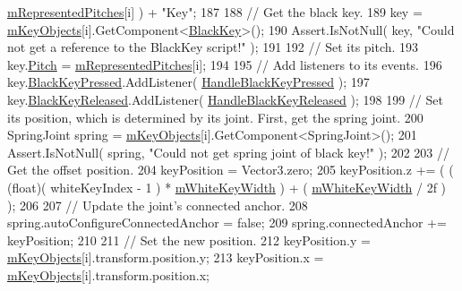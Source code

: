\begin{DoxyCode}
      \hyperlink{group___key_contain_priv_var_ga103945a6efe3469191e5253d13fec5be}{mRepresentedPitches}[i] ) + \textcolor{stringliteral}{"Key"};
187 
188                 \textcolor{comment}{// Get the black key.}
189                 key = \hyperlink{group___key_contain_priv_var_ga01addf187bb12ffe824374df98e2c2d8}{mKeyObjects}[i].GetComponent<\hyperlink{class_black_key}{BlackKey}>();
190                 Assert.IsNotNull( key, \textcolor{stringliteral}{"Could not get a reference to the BlackKey script!"} );
191 
192                 \textcolor{comment}{// Set its pitch.}
193                 key.\hyperlink{group___black_key_pub_var_gad233c456182c9cef7c01486484940439}{Pitch} = \hyperlink{group___key_contain_priv_var_ga103945a6efe3469191e5253d13fec5be}{mRepresentedPitches}[i];
194 
195                 \textcolor{comment}{// Add listeners to its events.}
196                 key.\hyperlink{group___black_key_events_ga51f1badf49df0c54e31a20ba4b7abd6b}{BlackKeyPressed}.AddListener( 
      \hyperlink{group___key_contain_handlers_ga05cc2543fd9772b26e27bf4f6247ab47}{HandleBlackKeyPressed} );
197                 key.\hyperlink{group___black_key_events_ga2710bdaba16dbdb82c0d38f11ce642d8}{BlackKeyReleased}.AddListener( 
      \hyperlink{group___key_contain_handlers_ga5a0c5565c5ebc6026b3122f487e51704}{HandleBlackKeyReleased} );
198 
199                 \textcolor{comment}{// Set its position, which is determined by its joint. First, get the spring joint.}
200                 SpringJoint spring = \hyperlink{group___key_contain_priv_var_ga01addf187bb12ffe824374df98e2c2d8}{mKeyObjects}[i].GetComponent<SpringJoint>();
201                 Assert.IsNotNull( spring, \textcolor{stringliteral}{"Could not get spring joint of black key!"} );
202 
203                 \textcolor{comment}{// Get the offset position.}
204                 keyPosition = Vector3.zero;
205                 keyPosition.z += ( ( (float)( whiteKeyIndex - 1 ) * 
      \hyperlink{group___key_contain_priv_var_gae5b8787a5242834f99ad8072e7ea6004}{mWhiteKeyWidth} ) + ( \hyperlink{group___key_contain_priv_var_gae5b8787a5242834f99ad8072e7ea6004}{mWhiteKeyWidth} / 2f ) );
206 
207                 \textcolor{comment}{// Update the joint's connected anchor.}
208                 spring.autoConfigureConnectedAnchor = \textcolor{keyword}{false};
209                 spring.connectedAnchor += keyPosition;
210 
211                 \textcolor{comment}{// Set the new position.}
212                 keyPosition.y = \hyperlink{group___key_contain_priv_var_ga01addf187bb12ffe824374df98e2c2d8}{mKeyObjects}[i].transform.position.y;
213                 keyPosition.x = \hyperlink{group___key_contain_priv_var_ga01addf187bb12ffe824374df98e2c2d8}{mKeyObjects}[i].transform.position.x;

\end{DoxyCode}
